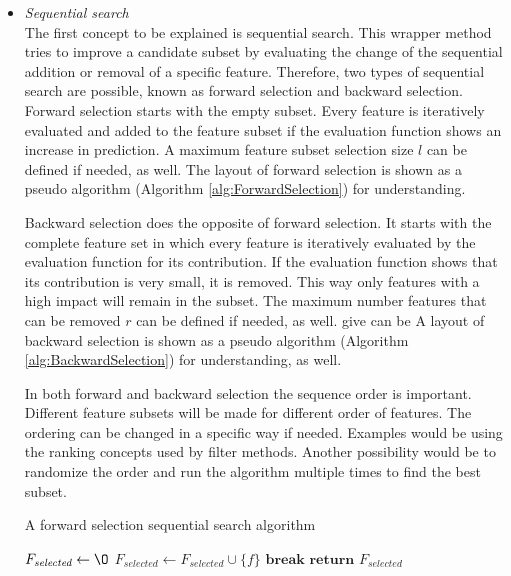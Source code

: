 \documentclass[10pt,a4paper]{report}
\begin{document}
	\begin{itemize}
		\item \textit{Sequential search} \\
		The first concept to be explained is sequential search. This wrapper method tries to improve a candidate subset by evaluating the change of the sequential addition or removal of a specific feature. Therefore, two types of sequential search are possible, known as forward selection and backward selection. Forward selection starts with the empty subset. Every feature is iteratively evaluated and added to the feature subset if the evaluation function shows an increase in prediction. A maximum feature subset selection size $l$ can be defined if needed, as well. The layout of forward selection is shown as a pseudo algorithm (Algorithm \ref{alg:ForwardSelection}) for understanding\cite{Reunanen2006}.
		
		Backward selection does the opposite of forward selection. It starts with the complete feature set in which every feature is iteratively evaluated by the evaluation function for its contribution. If the evaluation function shows that its contribution is very small, it is removed. This way only features with a high impact will remain in the subset. The maximum number features that can be removed $r$ can be defined if needed, as well. give can be A layout of backward selection is shown as a pseudo algorithm (Algorithm \ref{alg:BackwardSelection}) for understanding, as well\cite{Reunanen2006}.
		
		In both forward and backward selection the sequence order is important. Different feature subsets will be made for different order of features. The ordering can be changed in a specific way if needed. Examples would be using the ranking concepts used by filter methods. Another possibility would be to randomize the order and run the algorithm multiple times to find the best subset\cite{Reunanen2006}.
		
		\begin{algorithm}[H]
			\caption{A forward selection sequential search algorithm\cite{Reunanen2006}}\label{alg:ForwardSelection}
			\begin{algorithmic}[1]
				\State $F_{\textit{selected}} \gets \O$				
											
					
				\State $F_{\textit{selected}} \gets F_{\textit{selected}} \cup \{f\}$	
				\EndIf
						
				\State $\textbf{break}$
				\EndIf
				\EndFor
				\State $\textbf{return } F_{\textit{selected}}$
				\EndProcedure
			\end{algorithmic}
		\end{algorithm}
		

\end{itemize}
\end{document}
